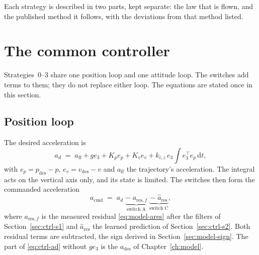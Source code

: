 Each strategy is described in two parts, kept separate: the law that is flown, and the published
method it follows, with the deviations from that method listed.

\section{The common controller}
\label{sec:ctrl-common}

Strategies~0--3 share one position loop and one attitude loop. The switches add terms to them; they
do not replace either loop. The equations are stated once in this section.

\subsection{Position loop}

The desired acceleration is
%
\begin{equation}
  a_{d}
  \;=\; a_{\mathrm{ff}} + g e_3 + K_p e_p + K_v e_v + k_{i,z}\, e_3 \!\int\! e_3^\top e_p \,\mathrm{d}t ,
  \label{eq:ctrl-ad}
\end{equation}
%
with $e_p = p_{\mathrm{des}} - p$, $e_v = v_{\mathrm{des}} - v$ and $a_{\mathrm{ff}}$ the
trajectory's acceleration. The integral acts on the vertical axis only, and its state is limited.
The switches then form the commanded acceleration
%
\begin{equation}
  a_{\mathrm{cmd}}
  \;=\; a_d
      \;\underbrace{-\; a_{\mathrm{res},f}}_{\text{switch A}}
      \;\underbrace{-\; \hat{a}_{\mathrm{res}}}_{\text{switch C}},
  \label{eq:ctrl-ades}
\end{equation}
%
where $a_{\mathrm{res},f}$ is the measured residual \eqref{eq:model-ares} after the filters of
Section~\ref{sec:ctrl-s1} and $\hat a_{\mathrm{res}}$ the learned prediction of
Section~\ref{sec:ctrl-s2}. Both residual terms are subtracted, the sign derived in
Section~\ref{sec:model-sign}. The part of \eqref{eq:ctrl-ad} without $g e_3$ is the $a_{\mathrm{des}}$
of Chapter~\ref{ch:model}.

